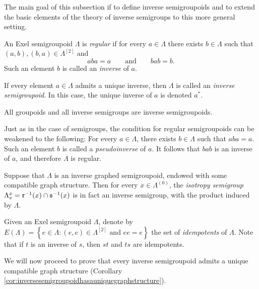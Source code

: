 The main goal of this subsection if to define inverse semigroupoids and to extend the basic elements of the theory of inverse semigroups to this more general setting.

\begin{definition}\label{def:inversesemigroupoid}
An Exel semigroupoid $\Lambda$ is \emph{regular} if for every $a\in\Lambda$ there exists $b\in\Lambda$ such that $(a,b),(b,a)\in\Lambda^{[2]}$ and
\[aba=a\qquad\text{and}\qquad bab=b.\label{eq:inversesemigroupoid}\]
Such an element $b$ is called an \emph{inverse} of $a$.

If every element $a\in\Lambda$ admits a unique inverse, then $\Lambda$ is called an \emph{inverse semigroupoid}. In this case, the unique inverse of $a$ is denoted $a^*$.
\end{definition}

All groupoids and all inverse semigroups are inverse semigroupoids.

Just as in the case of semigroups, the condition for regular semigroupoids can be weakened to the following: For every $a\in\Lambda$, there exists $b\in\Lambda$ such that $aba=a$. Such an element $b$ is called a \emph{pseudoinverse} of $a$. It follows that $bab$ is an inverse of $a$, and therefore $\Lambda$ is regular.

\begin{example}
Suppose that $\Lambda$ is an inverse graphed semigroupoid, endowed with some compatible graph structure. Then for every $x\in\Lambda^{(0)}$, the \emph{isotropy semigroup} $\Lambda_x^x=\operatorname{\mathfrak{r}}^{-1}(x)\cap\operatorname{\mathfrak{s}}^{-1}(x)$ is in fact an inverse semigroup, with the product induced by $\Lambda$.
\end{example}

Given an Exel semigroupoid $\Lambda$, denote by $E(\Lambda)=\left\{e\in \Lambda:(e,e)\in\Lambda^{[2]}\text{ and }ee=e\right\}$ the set of \emph{idempotents} of $\Lambda$. Note that if $t$ is an inverse of $s$, then $st$ and $ts$ are idempotents.

We will now proceed to prove that every inverse semigroupoid admits a unique compatible graph structure (Corollary \ref{cor:inversesemigroupoidhasauniquegraphstructure}).

